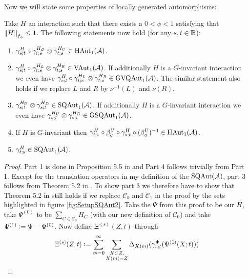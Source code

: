 \documentclass[11pt,a4paper,twoside]{article}
\numberwithin{equation}{section}
\begin{document}
{\begin{definition}
	\end{definition}
	Now we will state some properties of locally generated automorphisms:
	\begin{lemma}\label{lem:PropertiesLocallyGeneratedAutomorphisms}
		Take $H$ an interaction such that there exists a $0<\phi<1$ satisfying that $\norm{H}_{f_\phi}\leq 1$. The following statements now hold (for any $s,t\in\RR$):
		\begin{enumerate}
			\item $\gamma^H_{s;t}\circ\gamma^{H_D}_{t;s}\otimes\gamma^{H_U}_{t;s}\in\textrm{HAut}_1(\AA)$.
			\item $\gamma^H_{s;t}\circ\gamma^{H_L}_{t;s}\otimes\gamma^{H_R}_{t;s}\in\textrm{VAut}_1(\AA)$. If additionally $H$ is a $G$-invariant interaction we even have $\gamma^H_{s;t}\circ\gamma^{H_L}_{t;s}\otimes\gamma^{H_R}_{t;s}\in\textrm{GVQAut}_1(\AA)$. The similar statement also holds if we replace $L$ and $R$ by $\nu^{-1}(L)$ and $\nu(R)$.
			\item $\gamma^{H_U}_{s;t}\otimes\gamma^{H_D}_{s;t}\in\textrm{SQAut}_1(\AA)$. If additionally $H$ is a $G$-invariant interaction we even have $\gamma^{H_U}_{s;t}\otimes\gamma^{H_D}_{s;t}\in\textrm{GSQAut}_1(\AA)$.
			\item If $H$ is $G$-invariant then $\gamma^{H}_{t;s}\circ\beta_g^U\circ\gamma^{H}_{s;t}\circ(\beta_g^U)^{-1}\in\textrm{HAut}_1(\AA)$.
			\item $\gamma^{H}_{t;s}\in\textrm{SQAut}_1(\AA)$.
		\end{enumerate}
	\end{lemma}
	\begin{proof}
		Part 1 is done in Proposition 5.5 in \cite{ogata2021h3gmathbb} and Part 4 follows trivially from Part 1. Except for the translation operators in my definition of the $\textrm{SQAut}(\AA)$, part 3 follows from Theorem 5.2 in \cite{ogata2021h3gmathbb}. To show part 3 we therefore have to show that Theorem 5.2 in \cite{ogata2021h3gmathbb} still holds if we replace $\mathcal{C}_0$ and $\mathcal{C}_1$ in the proof by the sets highlighted in figure \ref{fig:SetupSQAut2}. Take the $\Psi$ from this proof to be our $H$, take $\Psi^{(0)}$ to be $\sum_{C\in\mathcal{C}_0}H_{C}$ (with our new definition of $\mathcal{C}_0$) and take $\Psi^{(1)}\defeq \Psi-\Psi^{(0)}$. Now define $\Xi^{(s)}(Z,t)$ through
		\begin{equation}\label{eq:PropertiesLocallyGeneratedAutomorphismsProofDefinitionXi}
			\Xi^{(s)}(Z,t)\defeq\sum_{m=0}^\infty \sum_{\substack{X\subset Z,\\X(m)=Z}}\Delta_{X(m)}(\gamma^\Psi_{s;t}(\Psi^{(1)}(X;t)))

\end{equation}
\end{proof}}
\end{document}
